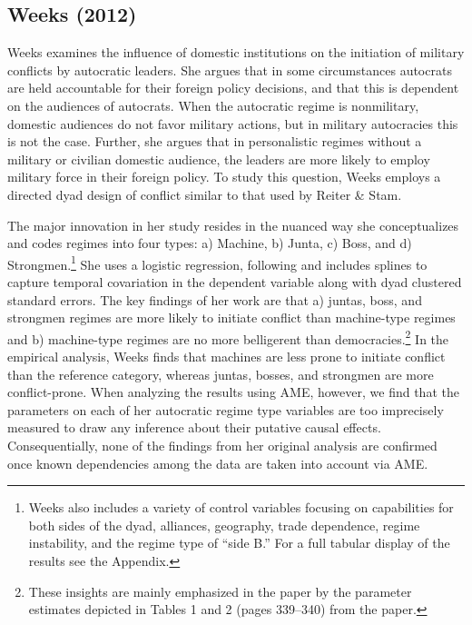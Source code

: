 \subsection{Weeks (2012)}

\nocite{weeks:2012} Weeks examines the influence of domestic institutions on the initiation of military conflicts by autocratic leaders. She argues that in some circumstances autocrats are held accountable for their foreign policy decisions, and that this is dependent on the audiences of autocrats. When the autocratic regime is nonmilitary, domestic audiences do not favor military actions, but in military autocracies this is not the case. Further, she argues that in personalistic regimes without a military or civilian domestic audience, the leaders are more likely to employ military force in their foreign policy. To study this question, Weeks employs a directed dyad design of conflict similar to that used by Reiter \& Stam.

The major innovation in her study resides in the nuanced way she conceptualizes and codes regimes into four types: a) Machine, b) Junta, c) Boss, and d) Strongmen.\footnote{Weeks also includes a variety of control variables focusing on capabilities for both sides of the dyad, alliances, geography, trade dependence, regime instability, and the regime type of ``side B.'' For a full tabular display of the results see the Appendix.} She uses a logistic regression, following \citet{beck:etal:1998} and includes splines to capture temporal covariation in the dependent variable along with dyad clustered standard errors. The key findings of her work are that a) juntas, boss, and strongmen regimes are more likely to initiate conflict than machine-type regimes and b) machine-type regimes are no more belligerent than democracies.\footnote{These insights are mainly emphasized in the paper by the parameter estimates depicted in Tables 1 and 2 (pages 339--340) from the paper.} In the empirical analysis, Weeks finds that machines are less prone to initiate conflict than the reference category, whereas juntas, bosses, and strongmen are more conflict-prone. When analyzing the results using AME, however, we find that the parameters on each of her autocratic regime type variables are too imprecisely measured to draw any inference about their putative causal effects. Consequentially, none of the findings from her original analysis are confirmed once known dependencies among the data are taken into account via AME.

